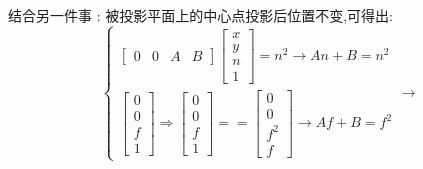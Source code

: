 \documentclass[UTF8]{ctexbook}
\begin{document}
{{{{\begin{itemize}
{\begin{itemize}
{                        结合另一件事 : 被投影平面上的中心点投影后位置不变,可得出:$$
                          \begin{cases}
                            \left[\begin{array}{cccc}
                                0 & 0 & A & B
                              \end{array}\right]
                            \left[\begin{array}{c}
                                x \\
                                y \\
                                n \\
                                1
                              \end{array}\right]
                            =
                            n^2
                            \rightarrow
                            An + B = n^2 \\
                            \left[\begin{array}{c}
                                0 \\
                                0 \\
                                f \\
                                1
                              \end{array}\right]
                            \Rightarrow
                            \left[\begin{array}{c}
                                0 \\
                                0 \\
                                f \\
                                1
                              \end{array}\right]
                            ==
                            \left[\begin{array}{c}
                                0   \\
                                0   \\
                                f^2 \\
                                f
                              \end{array}\right]
                            \rightarrow
                            Af + B = f^2
                          \end{cases}
                          \rightarrow
$$}
\end{itemize}}
\end{itemize}}}}}
\end{document}
